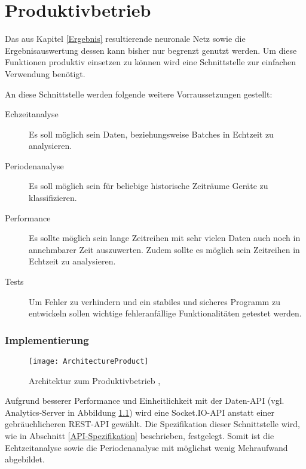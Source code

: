 \chapter{Produktivbetrieb}
    Das aus Kapitel \ref{Ergebnis} resultierende neuronale Netz sowie die Ergebnisauswertung dessen kann bisher nur begrenzt genutzt werden.
    Um diese Funktionen produktiv einsetzen zu können wird eine Schnittstelle zur einfachen Verwendung benötigt.
    
    An diese Schnittstelle werden folgende weitere Vorraussetzungen gestellt:
    \begin{description}
        \item[Echzeitanalyse] 
            Es soll möglich sein Daten, beziehungsweise Batches in Echtzeit zu analysieren.
        \item[Periodenanalyse] 
            Es soll möglich sein für beliebige historische Zeiträume Geräte zu klassifizieren.
        \item[Performance] 
            Es sollte möglich sein lange Zeitreihen mit sehr vielen Daten auch noch in annehmbarer Zeit auszuwerten. Zudem sollte es möglich sein Zeitreihen in Echtzeit zu analysieren.
        \item[Tests] 
            Um Fehler zu verhindern und ein stabiles und sicheres Programm zu entwickeln sollen wichtige fehleranfällige Funktionalitäten getestet werden.
    \end{description}
    
    \subsection{Implementierung}

        \begin{figure}[h]
            \centering
            \texttt{[image: ArchitectureProduct]}
            \caption{Architektur zum Produktivbetrieb \protect\cite{DrawIO}, \protect\cite{Tensorflow}}
            \label{fig:ArchitectureProduct}
        \end{figure}

        Aufgrund besserer Performance und Einheitlichkeit mit der Daten-API (vgl. Analytics-Server in Abbildung \ref{fig:ArchitectureProduct}) wird eine Socket.IO-API anstatt einer gebräuchlicheren REST-API gewählt.
        Die Spezifikation dieser Schnittstelle wird, wie in Abschnitt \ref{API-Spezifikation} beschrieben, festgelegt. 
        Somit ist die Echtzeitanalyse sowie die Periodenanalyse mit möglichst wenig Mehraufwand abgebildet.
        \newline

